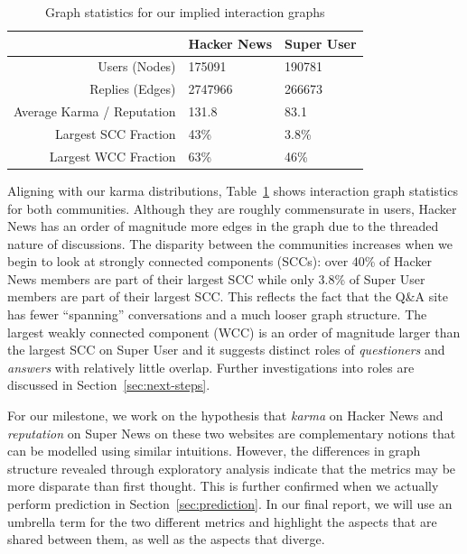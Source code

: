 \documentclass[10pt]{article}
\begin{document}
\begin{table}[H]
\begin{center}
\begin{tabular}{| r | l l |}
\hline
& \textbf{Hacker News} & \textbf{Super User} \\
\hline
Users (Nodes) & 175091 & 190781 \\
Replies (Edges) & 2747966 & 266673 \\
Average Karma / Reputation & 131.8 & 83.1 \\
Largest SCC Fraction & 43\% & 3.8\% \\
Largest WCC Fraction & 63\% & 46\% \\
\hline
\end{tabular}
\end{center}
\caption{Graph statistics for our implied interaction graphs}
\label{tab:graphstats}
\end{table}

Aligning with our karma distributions, Table~\ref{tab:graphstats} shows
interaction graph statistics for both communities. Although they are roughly
commensurate in users, Hacker News has an order of magnitude more edges in the
graph due to the threaded nature of discussions. The disparity between the
communities increases when we begin to look at strongly connected components
(SCCs): over 40\% of Hacker News members are part of their largest SCC while
only 3.8\% of Super User members are part of their largest SCC\@. This reflects
the fact that the Q\&A site has fewer ``spanning'' conversations and a much
looser graph structure. The largest weakly connected component (WCC) is an order
of magnitude larger than the largest SCC on Super User and it suggests 
distinct roles of \textit{questioners} and \textit{answers} with
relatively little overlap. Further investigations into roles are discussed
in Section~\ref{sec:next-steps}.

For our milestone, we work on the hypothesis that \textit{karma} on Hacker News
and \textit{reputation} on Super News on these two websites are complementary
notions that can be modelled using similar intuitions. However, the differences
in graph structure revealed through exploratory analysis indicate that the
metrics may be more disparate than first thought. This is further confirmed when
we actually perform prediction in Section~\ref{sec:prediction}. In our
final report, we will use an umbrella term for the two different metrics and
highlight the aspects that are shared between them, as well as the aspects that
diverge.
\end{document}
